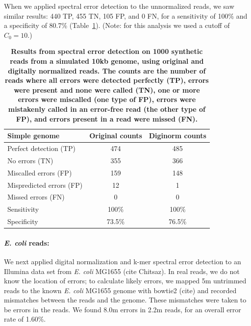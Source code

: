 \documentclass{article}
\begin{document}
When we applied spectral error detection to the unnormalized reads, we
saw similar results: 440 TP, 455 TN, 105 FP, and 0 FN, for a
sensitivity of 100\% and a specificity of 80.7\% (Table~\ref{tab:a}).
(Note: for this analysis we used a cutoff of $C_0=10$.)


\begin{table}
\begin{tabular}{|l|c|c|}
\hline
{\bf Simple genome} & Original counts & Diginorm counts \\
\hline
Perfect detection (TP) & 474 & 485 \\
No errors (TN) & 355 & 366 \\
Miscalled errors (FP) & 159 & 148 \\
Mispredicted errors (FP) & 12 & 1 \\
Missed errors (FN) & 0 & 0 \\
\hline
Sensitivity & 100\% & 100\% \\
Specificity & 73.5\% & 76.5\% \\
\hline
\end{tabular}

\caption{{\bf Results from spectral error detection on 1000 synthetic
    reads from a simulated 10kb genome, using original and digitally
    normalized reads.  The counts are the number of reads where all
    errors were detected perfectly (TP), errors were present and none
    were called (TN), one or more errors were miscalled (one type of
    FP), errors were mistakenly called in an error-free read (the
    other type of FP), and errors present in a read were missed
    (FN).}}
\label{tab:a}
\end{table}


\paragraph{{\em E. coli} reads:}
We next applied digital normalization and k-mer spectral error
detection to an Illumina data set from {\em E. coli} MG1655 (cite
Chitsaz).  In real reads, we do not know the location of errors; to
calculate likely errors, we mapped 5m untrimmed reads to the known {\em
  E. coli} MG1655 genome with bowtie2 (cite) and recorded mismatches
between the reads and the genome.  These mismatches were taken to be
errors in the reads.  We found 8.0m errors in 2.2m reads, for an
overall error rate of 1.60\%.
\end{document}
